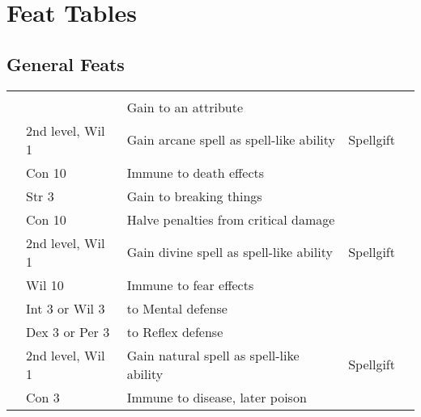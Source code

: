 \section{Feat Tables}
\onecolumn

\subsection{General Feats}
\begin{longtabuwrapper}
    \begin{longtabu}{>{\lcol}p{10em} >{\lcol}p{15em} >{\lcol}X >{\lcol}p{8em} >{\lcol}p{3em}}
         &  &  &  &  \\
         & \x & Gain  to an attribute           & \x &  \\
         & 2nd level, Wil 1 & Gain arcane spell as spell-like ability & Spellgift &  \\
         & Con 10 & Immune to death effects                    & \x &  \\
         & Str 3 & Gain  to breaking things            & \x &  \\
         & Con 10 & Halve penalties from critical damage         & \x &  \\
         & 2nd level, Wil 1 & Gain divine spell as spell-like ability & Spellgift &  \\
         & Wil 10 & Immune to fear effects                      & \x &  \\
         & Int 3 or Wil 3 &  to Mental defense           & \x &  \\
         & Dex 3 or Per 3 &   to Reflex defense & \x &  \\
         & 2nd level, Wil 1 & Gain natural spell as spell-like ability & Spellgift &  \\
         & Con 3 & Immune to disease, later poison        & \x &  \\

\end{longtabu}
\end{longtabuwrapper}
